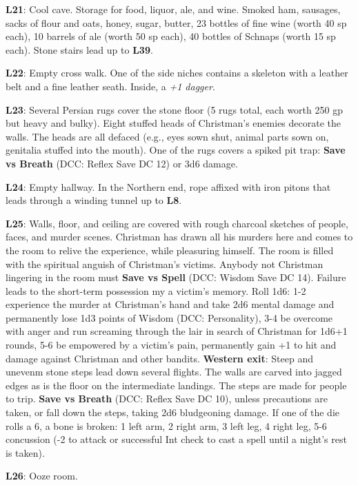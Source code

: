 \documentclass[
]{book}
\begin{document}
\textbf{L21}: Cool cave. Storage for food, liquor, ale, and wine. Smoked ham, sausages, sacks of flour and oats, honey, sugar, butter, 23 bottles of fine wine (worth 40 sp each), 10 barrels of ale (worth 50 sp each), 40 bottles of Schnaps (worth 15 sp each). Stone stairs lead up to \textbf{L39}.

\textbf{L22}: Empty cross walk. One of the side niches contains a skeleton with a leather belt and a fine leather seath. Inside, a \emph{+1 dagger}.

\textbf{L23}: Several Persian rugs cover the stone floor (5 rugs total, each worth 250 gp but heavy and bulky). Eight stuffed heads of Christman's enemies decorate the walls. The heads are all defaced (e.g., eyes sown shut, animal parts sown on, genitalia stuffed into the mouth). One of the rugs covers a spiked pit trap: \textbf{Save vs Breath} (DCC: Reflex Save DC 12) or 3d6 damage.

\textbf{L24}: Empty hallway. In the Northern end, rope affixed with iron pitons that leads through a winding tunnel up to \textbf{L8}.

\textbf{L25}: Walls, floor, and ceiling are covered with rough charcoal sketches of people, faces, and murder scenes. Christman has drawn all his murders here and comes to the room to relive the experience, while pleasuring himself. The room is filled with the spiritual anguish of Christman's victims. Anybody not Christman lingering in the room must \textbf{Save vs Spell} (DCC: Wisdom Save DC 14). Failure leads to the short-term possession my a victim's memory. Roll 1d6: 1-2 experience the murder at Christman's hand and take 2d6 mental damage and permanently lose 1d3 points of Wisdom (DCC: Personality), 3-4 be overcome with anger and run screaming through the lair in search of Christman for 1d6+1 rounds, 5-6 be empowered by a victim's pain, permanently gain +1 to hit and damage against Christman and other bandits. \textbf{Western exit}: Steep and unevenm stone steps lead down several flights. The walls are carved into jagged edges as is the floor on the intermediate landings. The steps are made for people to trip. \textbf{Save vs Breath} (DCC: Reflex Save DC 10), unless precautions are taken, or fall down the steps, taking 2d6 bludgeoning damage. If one of the die rolls a 6, a bone is broken: 1 left arm, 2 right arm, 3 left leg, 4 right leg, 5-6 concussion (-2 to attack or successful Int check to cast a spell until a night's rest is taken).

\textbf{L26}: Ooze room.
\end{document}
